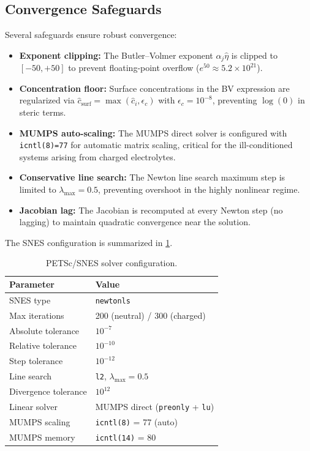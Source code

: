 \documentclass[11pt,a4paper]{article}
\begin{document}
\subsection{Convergence Safeguards}\label{sec:safeguards}

Several safeguards ensure robust convergence:

\begin{itemize}
  \item \textbf{Exponent clipping:} The Butler--Volmer exponent
    $\alpha_j \hat{\eta}$ is clipped to $[-50, +50]$ to prevent floating-point
    overflow ($e^{50} \approx 5.2\times10^{21}$).
  \item \textbf{Concentration floor:} Surface concentrations in the BV
    expression are regularized via
    $\hat{c}_{\mathrm{surf}} = \max(\hat{c}_i, \epsilon_c)$ with
    $\epsilon_c = 10^{-8}$, preventing $\log(0)$ in steric terms.
  \item \textbf{MUMPS auto-scaling:} The MUMPS direct solver is configured
    with \texttt{icntl(8)=77} for automatic matrix scaling, critical for
    the ill-conditioned systems arising from charged electrolytes.
  \item \textbf{Conservative line search:} The Newton line search maximum
    step is limited to $\lambda_{\max} = 0.5$, preventing overshoot in
    the highly nonlinear regime.
  \item \textbf{Jacobian lag:} The Jacobian is recomputed at every Newton
    step (no lagging) to maintain quadratic convergence near the solution.
\end{itemize}

The SNES configuration is summarized in \cref{tab:snes}.

\begin{table}[H]
\centering
\caption{PETSc/SNES solver configuration.}
\label{tab:snes}
\begin{tabular}{ll}
\toprule
Parameter & Value \\
\midrule
SNES type & \texttt{newtonls} \\
Max iterations & 200 (neutral) / 300 (charged) \\
Absolute tolerance & $10^{-7}$ \\
Relative tolerance & $10^{-10}$ \\
Step tolerance & $10^{-12}$ \\
Line search & \texttt{l2}, $\lambda_{\max} = 0.5$ \\
Divergence tolerance & $10^{12}$ \\
Linear solver & MUMPS direct (\texttt{preonly} + \texttt{lu}) \\
MUMPS scaling & \texttt{icntl(8)} = 77 (auto) \\
MUMPS memory & \texttt{icntl(14)} = 80 \\
\bottomrule
\end{tabular}
\end{table}
\end{document}
